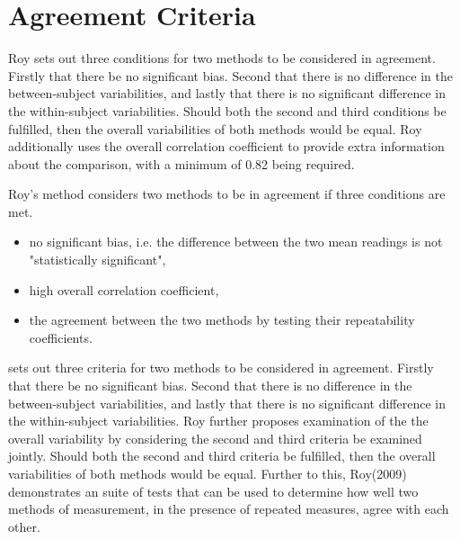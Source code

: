 \documentclass[12pt, a4paper]{report}
\theoremstyle{plain}
\theoremstyle{definition}
\theoremstyle{remark}
\begin{document}
\section{Agreement Criteria}	

Roy sets out three conditions for two methods to be considered in agreement. Firstly that there be no significant bias. Second that there is no difference in the between-subject variabilities, and lastly that there is no significant difference in the within-subject variabilities. Should both the second and third conditions be fulfilled, then the overall variabilities of both methods would be equal. Roy additionally uses the overall correlation coefficient to provide extra information about the comparison, with a minimum of 0.82 being required.


Roy's method considers two methods to be in agreement if three
conditions are met.

\begin{itemize}
	\item no significant bias, i.e. the difference between the two
	mean readings is not "statistically significant",
	
	\item high overall correlation coefficient,
	
	\item the agreement between the two methods by testing their
	repeatability coefficients.
	
\end{itemize}


%
%
\citet{ARoy2009} sets out three criteria for two methods to be considered in agreement. Firstly that there be no significant bias. Second that there is no difference in the between-subject variabilities, and lastly that there is no significant difference in the within-subject variabilities. Roy further proposes examination of the the overall variability by considering the second and third criteria be examined jointly. Should both the second and third criteria be fulfilled, then the overall variabilities of both methods would be equal.
Further to this, Roy(2009) demonstrates an suite of tests that can be used to determine how well two methods of measurement, in the presence of repeated measures, agree with each other.
\end{document}
